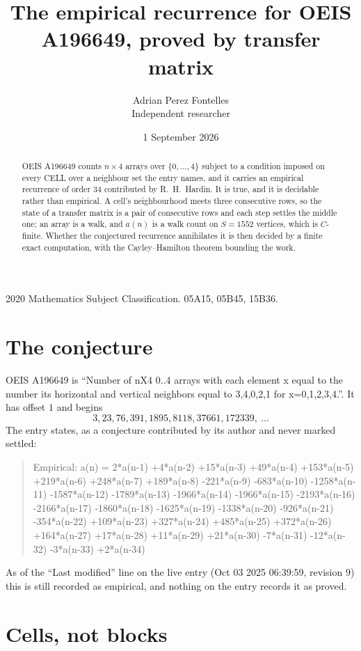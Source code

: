 \documentclass[11pt,a4paper]{article}
\title{The empirical recurrence for OEIS A196649, proved by transfer matrix}
\author{Adrian Perez Fontelles\\ \small Independent researcher}
\date{1 September 2026}
\theoremstyle{plain}
\theoremstyle{definition}
\begin{document}
\maketitle

\begin{abstract}
OEIS A196649 counts $n\times4$ arrays over $\{0,\dots,4\}$ subject to a condition imposed on
every CELL over a neighbour set the entry names, and it carries an empirical recurrence of
order $34$ contributed by R.~H.~Hardin. It is true, and it is decidable rather than
empirical. A cell's neighbourhood meets three consecutive rows, so the state of a transfer
matrix is a pair of consecutive rows and each step settles the middle one; an array is a
walk, and $a(n)$ is a walk count on $S=1552$ vertices, which is $C$-finite. Whether the
conjectured recurrence annihilates it is then decided by a finite exact computation, with the
Cayley--Hamilton theorem bounding the work.
\end{abstract}

\noindent\small 2020 Mathematics Subject Classification. 05A15, 05B45, 15B36.\normalsize

\section{The conjecture}

OEIS A196649 is ``Number of nX4 0..4 arrays with each element x equal to the number its horizontal and vertical neighbors equal to 3,4,0,2,1 for x=0,1,2,3,4.''. It has offset $1$ and begins
\[
3, 23, 76, 391, 1895, 8118, 37661, 172339,\ \dots
\]
The entry states, as a conjecture contributed by its author and never marked settled:
\begin{quote}
Empirical: a(n) = 2*a(n-1) +4*a(n-2) +15*a(n-3) +49*a(n-4) +153*a(n-5) +219*a(n-6) +248*a(n-7) +189*a(n-8) -221*a(n-9) -683*a(n-10) -1258*a(n-11) -1587*a(n-12) -1789*a(n-13) -1966*a(n-14) -1966*a(n-15) -2193*a(n-16) -2166*a(n-17) -1860*a(n-18) -1625*a(n-19) -1338*a(n-20) -926*a(n-21) -354*a(n-22) +109*a(n-23) +327*a(n-24) +485*a(n-25) +372*a(n-26) +164*a(n-27) +17*a(n-28) +11*a(n-29) +21*a(n-30) -7*a(n-31) -12*a(n-32) -3*a(n-33) +2*a(n-34)
\end{quote}
As of the ``Last modified'' line on the live entry (Oct 03 2025 06:39:59, revision 9) this is still
recorded as empirical, and nothing on the entry records it as proved.

\section{Cells, not blocks}
\end{document}
